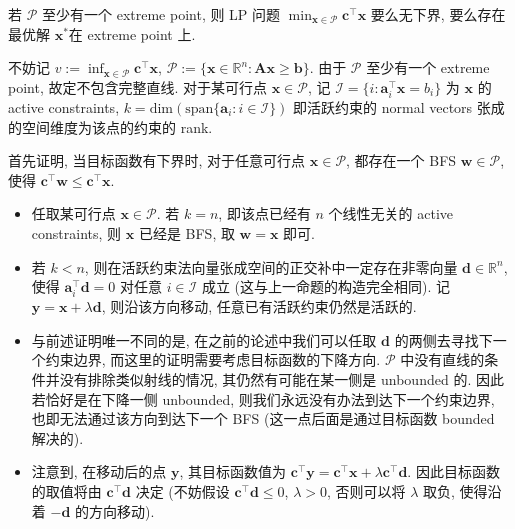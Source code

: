 \begin{thmblock}
若 $\mathcal{P}$ 至少有一个 extreme point, 则 LP 问题 $\min_{\bm{x} \in \mathcal{P}} \bm{c}^\top \bm{x}$ 要么无下界, 要么存在最优解 $\bm{x}^*$在 extreme point 上.


\begin{proof*}[{Proof}]
不妨记 $v:= \inf_{\bm{x} \in \mathcal{P}} \bm{c}^\top \bm{x}$, $\mathcal{P} := \{\bm{x} \in \mathbb{R}^n: \bm{A}\bm{x} \geq \bm{b}\}$. 由于 $\mathcal{P}$ 至少有一个 extreme point, 故定不包含完整直线. 对于某可行点 $\bm{x} \in \mathcal{P}$, 记 $\mathcal{I} = \{i: \bm{a}_i^\top \bm{x} = b_i\}$ 为 $\bm{x}$ 的 active constraints, $k = \text{dim}(\text{span}\{\bm{a}_i: i \in \mathcal{I}\})$ 即活跃约束的 normal vectors 张成的空间维度为该点的约束的 rank.

首先证明, 当目标函数有下界时, 对于任意可行点 $\bm{x} \in \mathcal{P}$, 都存在一个 BFS $\bm{w} \in \mathcal{P}$, 使得 $\bm{c}^\top \bm{w} \leq \bm{c}^\top \bm{x}$.

\begin{itemize}
\item {}任取某可行点 $\bm{x} \in \mathcal{P}$. 若 $k = n$, 即该点已经有 $n$ 个线性无关的 active constraints, 则 $\bm{x}$ 已经是 BFS, 取 $\bm{w} = \bm{x}$ 即可.


\item {}若 $k < n$, 则在活跃约束法向量张成空间的正交补中一定存在非零向量 $\bm{d} \in \mathbb{R}^n$, 使得 $\bm{a}_i^\top \bm{d} = 0$ 对任意 $i \in \mathcal{I}$ 成立 (这与上一命题的构造完全相同). 记 $\bm{y} = \bm{x} + \lambda \bm{d}$, 则沿该方向移动, 任意已有活跃约束仍然是活跃的.


\item {}与前述证明唯一不同的是, 在之前的论述中我们可以任取 $\bm{d}$ 的两侧去寻找下一个约束边界, 而这里的证明需要考虑目标函数的下降方向. $\mathcal{P}$ 中没有直线的条件并没有排除类似射线的情况, 其仍然有可能在某一侧是 unbounded 的. 因此若恰好是在下降一侧 unbounded, 则我们永远没有办法到达下一个约束边界, 也即无法通过该方向到达下一个 BFS (这一点后面是通过目标函数 bounded 解决的).


\item {}注意到, 在移动后的点 $\bm{y}$, 其目标函数值为 $\bm{c}^\top \bm{y} = \bm{c}^\top \bm{x} + \lambda \bm{c}^\top \bm{d}$. 因此目标函数的取值将由 $\bm{c}^\top \bm{d}$ 决定 (不妨假设 $\bm{c}^\top \bm{d} \leq 0$, $\lambda > 0$, 否则可以将 $\lambda$ 取负, 使得沿着 $-\bm{d}$ 的方向移动).


\end{itemize}
\end{proof*}
\end{thmblock}
